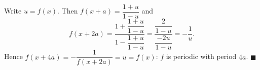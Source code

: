 Write $u=f(x)$. Then $f(x+a)=\dfrac{1+u}{1-u}$ and
\[f(x+2a)=\dfrac{1+\dfrac{1+u}{1-u}}{1-\dfrac{1+u}{1-u}}=\dfrac{\dfrac2{1-u}}{\dfrac{-2u}{1-u}}=-\dfrac1u.\]
Hence $f(x+4a)=-\dfrac1{f(x+2a)}=u=f(x)$: $f$ is periodic with period $4a$. $\blacksquare$
